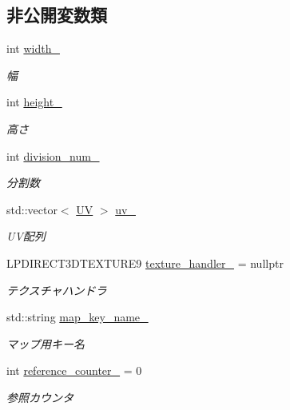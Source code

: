 \subsection*{非公開変数類}
\begin{DoxyCompactItemize}
\item 
int \mbox{\hyperlink{class_texture_object_a8e3d1b2b233672e0ea161b21d9c1cae0}{width\+\_\+}}
\begin{DoxyCompactList}\small\item\em 幅 \end{DoxyCompactList}\item 
int \mbox{\hyperlink{class_texture_object_a093e31e35a181fe208cc8a0c0cdb5e2f}{height\+\_\+}}
\begin{DoxyCompactList}\small\item\em 高さ \end{DoxyCompactList}\item 
int \mbox{\hyperlink{class_texture_object_a73649c56b0b9a677591290db4e91336c}{division\+\_\+num\+\_\+}}
\begin{DoxyCompactList}\small\item\em 分割数 \end{DoxyCompactList}\item 
std\+::vector$<$ \mbox{\hyperlink{class_texture_object_1_1_u_v}{UV}} $>$ \mbox{\hyperlink{class_texture_object_a7339dcda7d43fe018b5334633412439a}{uv\+\_\+}}
\begin{DoxyCompactList}\small\item\em U\+V配列 \end{DoxyCompactList}\item 
L\+P\+D\+I\+R\+E\+C\+T3\+D\+T\+E\+X\+T\+U\+R\+E9 \mbox{\hyperlink{class_texture_object_a7274bd60ef37cd410b49e8cfc579624e}{texture\+\_\+handler\+\_\+}} = nullptr
\begin{DoxyCompactList}\small\item\em テクスチャハンドラ \end{DoxyCompactList}\item 
std\+::string \mbox{\hyperlink{class_texture_object_aac29aa6f8a584478303861cff2efd6b6}{map\+\_\+key\+\_\+name\+\_\+}}
\begin{DoxyCompactList}\small\item\em マップ用キー名 \end{DoxyCompactList}\item 
int \mbox{\hyperlink{class_texture_object_a735b7aec5c831656d864c77dff079529}{reference\+\_\+counter\+\_\+}} = 0
\begin{DoxyCompactList}\small\item\em 参照カウンタ \end{DoxyCompactList}\end{DoxyCompactItemize}


